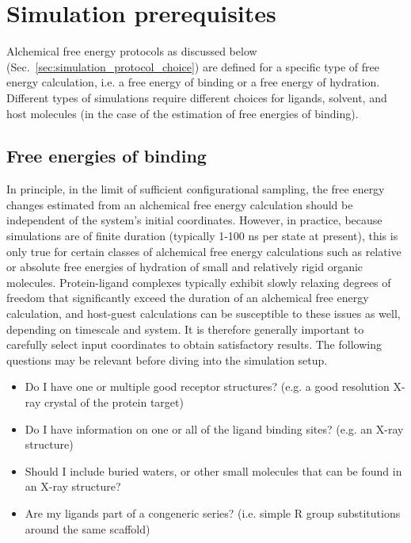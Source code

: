 \documentclass[9pt,bestpractices]{livecoms}
\begin{document}
\section{Simulation prerequisites}
\label{sec:prerequisites}
Alchemical free energy protocols as discussed below (Sec.~\ref{sec:simulation_protocol_choice}) are defined for a specific type of free energy calculation, i.e. a free energy of binding or a free energy of hydration. Different types of simulations require different choices for ligands, solvent, and host molecules (in the case of the estimation of free energies of binding).

\subsection{Free energies of binding}
\label{subsec:binding}
In principle, in the limit of sufficient configurational sampling, the free energy changes estimated from an alchemical free energy calculation should be independent of the system's initial coordinates. However, in practice, because simulations are of finite duration (typically 1-100 ns per state at present), this is only true for certain classes of alchemical free energy calculations such as relative or absolute free energies of hydration of small and relatively rigid organic molecules. Protein-ligand complexes typically exhibit slowly relaxing degrees of freedom that significantly exceed the duration of an alchemical free energy calculation, and host-guest calculations can be susceptible to these issues as well, depending on timescale and system. It is therefore generally important to carefully select input coordinates to obtain satisfactory results. 
The following questions may be relevant before diving into the simulation setup.

\begin{itemize}
    \item Do I have one or multiple good receptor structures? (e.g. a good resolution X-ray crystal of the protein target)
    \item Do I have information on one or all of the ligand binding sites? (e.g. an X-ray structure)
    \item Should I include buried waters, or other small molecules that can be found in an X-ray structure?
    \item Are my ligands part of a congeneric series? (i.e. simple R group substitutions around the same scaffold)
    \end{itemize}
\end{document}
